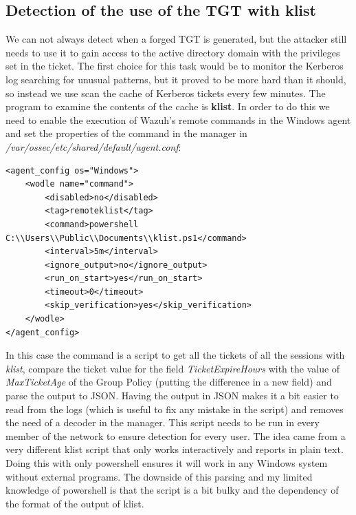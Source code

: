 \subsection{Detection of the use of the TGT with klist}
We can not always detect when a forged TGT is generated, but the attacker still needs to use it to gain access to the active directory domain with the privileges set in the ticket. The first choice for this task would be to monitor the Kerberos log searching for unusual patterns, but it proved to be more hard than it should, so instead we use scan the cache of Kerberos tickets every few minutes.
\linej
The program to examine the contents of the cache is \textbf{klist}.
\linej
\linej
In order to do this we need to enable the execution of Wazuh's remote commands in the Windows agent and set the properties of the command in the manager in \textit{/var/ossec/etc/shared/default/agent.conf}\cite{wazuh_remote_command}:
\linej
\begin{lstlisting}[style=xml]
<agent_config os="Windows">
	<wodle name="command">
		<disabled>no</disabled>
		<tag>remoteklist</tag>
		<command>powershell C:\\Users\\Public\\Documents\\klist.ps1</command>
		<interval>5m</interval>
		<ignore_output>no</ignore_output>
		<run_on_start>yes</run_on_start>
		<timeout>0</timeout>
		<skip_verification>yes</skip_verification>
	</wodle>
</agent_config>
\end{lstlisting}
\linej
In this case the command is a script to get all the tickets of all the sessions with \textit{klist}, compare the ticket value for the field \textit{TicketExpireHours} with the value of \textit{MaxTicketAge} of the Group Policy (putting the difference in a new field) and parse the output to JSON. Having the output in JSON makes it a bit easier to read from the logs (which is useful to fix any mistake in the script) and removes the need of a decoder in the manager. This script needs to be run in every member of the network to ensure detection for every user. The idea came from a very different klist script that only works interactively and reports in plain text\cite{klist_script_idea}.
\linej
Doing this with only powershell ensures it will work in any Windows system without external programs. The downside of this parsing and my limited knowledge of powershell is that the script is a bit bulky and the dependency of the format of the output of klist.
\linej

